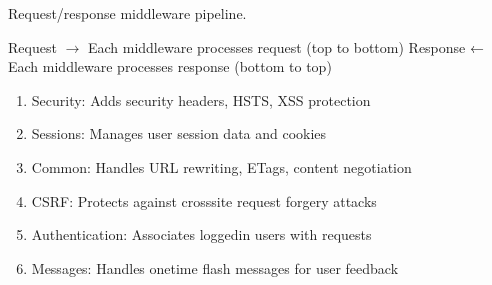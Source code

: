 \documentclass[letterpaper,10pt,english]{sphinxmanual}
\begin{document}

\begin{fulllineitems}
\label{\detokenize{softwareProject:softwareProject.settings.MIDDLEWARE}}
\pysigstartsignatures
\pysigline
{}
\pysigstopsignatures
\sphinxAtStartPar
Request/response middleware pipeline.
\begin{description}
\sphinxAtStartPar
Request \(\rightarrow\) Each middleware processes request (top to bottom)
Response ← Each middleware processes response (bottom to top)

\begin{enumerate}
%
\item {} 
\sphinxAtStartPar
Security: Adds security headers, HSTS, XSS protection

\item {} 
\sphinxAtStartPar
Sessions: Manages user session data and cookies

\item {} 
\sphinxAtStartPar
Common: Handles URL rewriting, ETags, content negotiation

\item {} 
\sphinxAtStartPar
CSRF: Protects against cross\sphinxhyphen{}site request forgery attacks

\item {} 
\sphinxAtStartPar
Authentication: Associates logged\sphinxhyphen{}in users with requests

\item {} 
\sphinxAtStartPar
Messages: Handles one\sphinxhyphen{}time flash messages for user feedback


\end{enumerate}
\end{description}
\end{fulllineitems}
\end{document}

